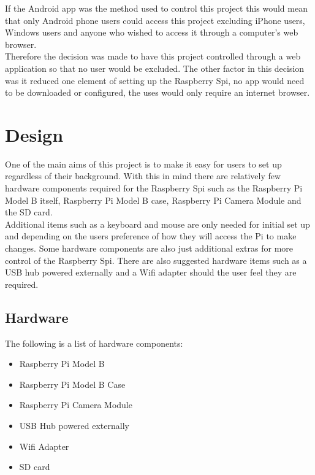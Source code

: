 \documentclass[12pt]{report}
\begin{document}
If the Android app was the method used to control this project this would mean that only Android phone users could access this project excluding iPhone users, Windows users and anyone who wished to access it through a computer's web browser.\\

Therefore the decision was made to have this project controlled through a web application so that no user would be excluded. The other factor in this decision was it reduced one element of setting up the Raspberry Spi, no app would need to be downloaded or configured, the uses would only require an internet browser.\\

% 
\chapter{Design}
\label{ch:design}
	One of the main aims of this project is to make it easy for users to set up regardless of their background. With this in mind there are relatively few hardware components required for the Raspberry Spi such as the Raspberry Pi Model B itself, Raspberry Pi Model B case, Raspberry Pi Camera Module and the SD card.\\
	 
Additional items such as a keyboard and mouse are only needed for initial set up and depending on the users preference of how they will access the Pi to make changes. Some hardware components are also just additional extras for more control of the Raspberry Spi. There are also suggested hardware items such as a USB hub powered externally and a Wifi adapter should the user feel they are required.\\
	
\section{Hardware}	
\label{sec:hardware}

The following is a list of hardware components:\\
\begin{itemize}
  \item Raspberry Pi Model B\\
  \item Raspberry Pi Model B Case\\
  \item Raspberry Pi Camera Module\\
  \item USB Hub powered externally\\
  \item Wifi Adapter\\
  \item SD card\\
\end{itemize} 
\end{document}
